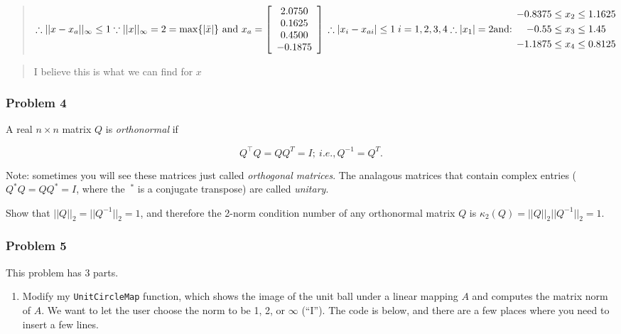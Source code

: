 \documentclass[]{article}
\providecommand{\tightlist}{%
  \setlength{\itemsep}{0pt}\setlength{\parskip}{0pt}}
\begin{document}
\begin{quote}
\[
\therefore ||x-x_{a}||_{\infty} \leq 1\\
\because ||x||_{\infty} = 2 = \max\{|\bar{x}|\} \text{ and } x_{a}=\left[\begin{array}{c}2.0750 \\ 0.1625 \\ 0.4500 \\ -0.1875 \end{array}\right]\\
\therefore |x_{i}-x_{ai}|\leq 1 \; i=1,2,3,4 \\
\therefore |x_{1}|=2\\
\text{and:  } 
\begin{aligned}-0.8375 & \leq x_{2} \leq 1.1625 \\-0.55 & \leq x_{3} \leq 1.45 \\-1.1875 & \leq x_{4} \leq 0.8125 \end{aligned}
\]
\end{quote}

\begin{quote}
I believe this is what we can find for \(x\)
\end{quote}

\hypertarget{problem-4}{%
\subsubsection{Problem 4}\label{problem-4}}

A real \(n \times n\) matrix \(Q\) is \emph{orthonormal} if

\[ Q^{\top}Q=QQ^T=I;~i.e., Q^{-1}=Q^T.\]

Note: sometimes you will see these matrices just called \emph{orthogonal
matrices}. The analagous matrices that contain complex entries
(\(Q^*Q=QQ^*=I\), where the \(~^*\) is a conjugate transpose) are called
\emph{unitary}.

Show that \(||Q||_2=||Q^{-1}||_2=1\), and therefore the 2-norm condition
number of any orthonormal matrix \(Q\) is
\(\kappa_2(Q)=||Q||_2 ||Q^{-1}||_2=1\).

\hypertarget{problem-5}{%
\subsubsection{Problem 5}\label{problem-5}}

This problem has 3 parts.

\begin{enumerate}
\def\labelenumi{(\alph{enumi})}
\tightlist
\item
  Modify my \texttt{UnitCircleMap} function, which shows the image of
  the unit ball under a linear mapping \(A\) and computes the matrix
  norm of \(A\). We want to let the user choose the norm to be 1, 2, or
  \(\infty\) (``I''). The code is below, and there are a few places
  where you need to insert a few lines.
\end{enumerate}
\end{document}
